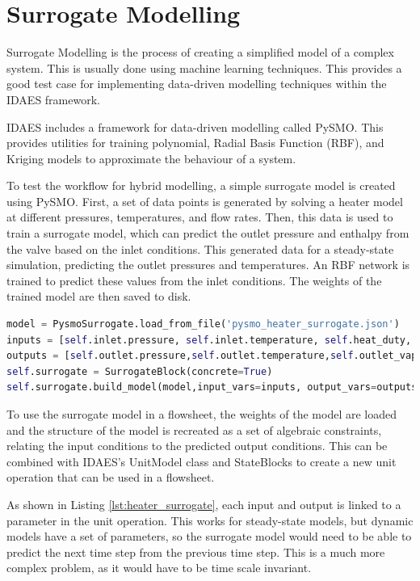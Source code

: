\section{Surrogate Modelling}
Surrogate Modelling is the process of creating a simplified model of a complex system. This is usually done using machine learning techniques. This provides a good test case for implementing data-driven modelling techniques within the IDAES framework.

IDAES includes a framework for data-driven modelling called PySMO. This provides utilities for training polynomial, Radial Basis Function (RBF), and Kriging models to approximate the behaviour of a system.

To test the workflow for hybrid modelling, a simple surrogate model is created using PySMO. First, a set of data points is generated by solving a heater model at different pressures, temperatures, and flow rates. 
Then, this data is used to train a surrogate model, which can predict the outlet pressure and enthalpy from the valve based on the inlet conditions. 
This generated data for a steady-state simulation, predicting the outlet pressures and temperatures. 
An RBF network is trained to predict these values from the inlet conditions.
The weights of the trained model are then saved to disk. 

\begin{lstlisting}[language=Python,caption=Using a surrogate model in IDAES,label=lst:heater_surrogate]
model = PysmoSurrogate.load_from_file('pysmo_heater_surrogate.json')
inputs = [self.inlet.pressure, self.inlet.temperature, self.heat_duty, self.inlet.flow_mol ]
outputs = [self.outlet.pressure,self.outlet.temperature,self.outlet_vapor]
self.surrogate = SurrogateBlock(concrete=True)
self.surrogate.build_model(model,input_vars=inputs, output_vars=outputs)
\end{lstlisting}

To use the surrogate model in a flowsheet, the weights of the model are loaded and the structure of the model is recreated as a set of algebraic constraints, relating the input conditions to the predicted output conditions. This can be combined with IDAES's UnitModel class and StateBlocks to create a new unit operation that can be used in a flowsheet.

As shown in Listing \ref{lst:heater_surrogate}, each input and output is linked to a parameter in the unit operation. This works for steady-state models, but dynamic models have a set of parameters, so the surrogate model would need to be able to predict the next time step from the previous time step. This is a much more complex problem, as it would have to be time scale invariant.


